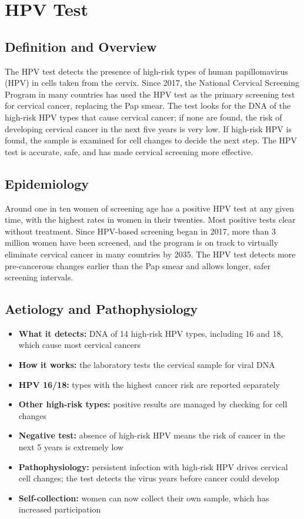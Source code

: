 \chapter{HPV Test}

\section*{Definition and Overview}
The HPV test detects the presence of high-risk types of human papillomavirus (HPV) in cells taken from the cervix. Since 2017, the National Cervical Screening Program in many countries has used the HPV test as the primary screening test for cervical cancer, replacing the Pap smear. The test looks for the DNA of the high-risk HPV types that cause cervical cancer; if none are found, the risk of developing cervical cancer in the next five years is very low. If high-risk HPV is found, the sample is examined for cell changes to decide the next step. The HPV test is accurate, safe, and has made cervical screening more effective.

\section*{Epidemiology}
Around one in ten women of screening age has a positive HPV test at any given time, with the highest rates in women in their twenties. Most positive tests clear without treatment. Since HPV-based screening began in 2017, more than 3 million women have been screened, and the program is on track to virtually eliminate cervical cancer in many countries by 2035. The HPV test detects more pre-cancerous changes earlier than the Pap smear and allows longer, safer screening intervals.

\section*{Aetiology and Pathophysiology}
\begin{itemize}
    \item \textbf{What it detects:} DNA of 14 high-risk HPV types, including 16 and 18, which cause most cervical cancers
    \item \textbf{How it works:} the laboratory tests the cervical sample for viral DNA
    \item \textbf{HPV 16/18:} types with the highest cancer risk are reported separately
    \item \textbf{Other high-risk types:} positive results are managed by checking for cell changes
    \item \textbf{Negative test:} absence of high-risk HPV means the risk of cancer in the next 5 years is extremely low
    \item \textbf{Pathophysiology:} persistent infection with high-risk HPV drives cervical cell changes; the test detects the virus years before cancer could develop
    \item \textbf{Self-collection:} women can now collect their own sample, which has increased participation
\end{itemize}

